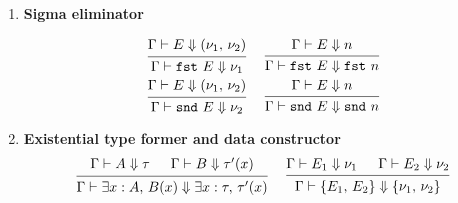 \documentclass{article}
\begin{document}
\begin{enumerate}
  \item \textbf{Sigma eliminator} \\
  \begin{spreadlines}{2em}
  \begin{gather*}
    \begin{prooftree}
      \hypo{\Gamma \vdash E \Downarrow (\nu_1, \, \nu_2)}
      \infer1{\Gamma \vdash \fst \,\, E \Downarrow \nu_1}
    \end{prooftree}
   ~ \quad
   \begin{prooftree}
    \hypo{\Gamma \vdash E \Downarrow n}
     \infer1{\Gamma \vdash \fst \,\, E \Downarrow \fst \,\, n}
   \end{prooftree}
  \\
    \begin{prooftree}
      \hypo{\Gamma \vdash E \Downarrow (\nu_1, \, \nu_2)}
      \infer1{\Gamma \vdash \snd \,\, E \Downarrow \nu_2}
    \end{prooftree}
  ~ \quad
   \begin{prooftree}
     \hypo{\Gamma \vdash E \Downarrow n}
     \infer1{\Gamma \vdash \snd \,\, E \Downarrow \snd \,\, n}
   \end{prooftree}
  \end{gather*}
 \end{spreadlines}

  \item \textbf{Existential type former and data constructor} \\
    \begin{gather*}
      \begin{prooftree}
        \hypo{\Gamma \vdash A \Downarrow \tau}
        \hypo{\Gamma \vdash B \Downarrow \tau'(x)}
        \infer2{\Gamma \vdash \exists x : A, \, B(x) \Downarrow \exists x : \tau, \, \tau'(x)}
      \end{prooftree}
      ~ \quad
      \begin{prooftree}
        \hypo{\Gamma \vdash E_1 \Downarrow \nu_1}
        \hypo{\Gamma \vdash E_2 \Downarrow \nu_2}
        \infer2{\Gamma \vdash \{E_1, \, E_2\} \Downarrow \{\nu_1, \, \nu_2\}}
      \end{prooftree}
    \end{gather*}
  

\end{enumerate}
\end{document}
